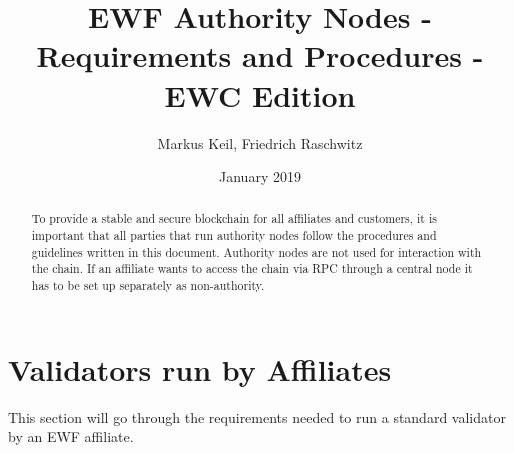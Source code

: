 \documentclass[11pt,a4paper,titlepage]{article}
\begin{document}
\title{EWF Authority Nodes - Requirements and Procedures - EWC Edition}
\author{Markus Keil, Friedrich Raschwitz}
\date{January 2019}

\maketitle

\begin{abstract}
To provide a stable and secure blockchain for all affiliates and customers, it is important that all parties that run authority nodes follow the procedures and guidelines written in this document.
Authority nodes are not used for interaction with the chain. If an affiliate wants to access the chain via RPC through a central node it has to be set up separately as non-authority.
\end{abstract}

\tableofcontents

\newpage

\newpage

\newpage

\newpage

\newpage

\newpage

\section{Validators run by Affiliates}

This section will go through the requirements needed to run a standard validator by an EWF affiliate.






%
\newpage



\newpage

\newpage

\end{document}
